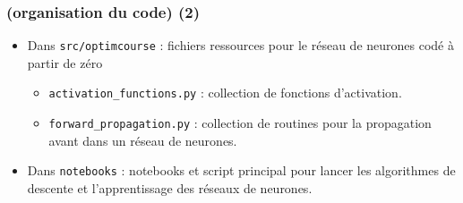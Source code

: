 \documentclass[12pt]{beamer}
\begin{document}
\begin{frame}
\frametitle{(organisation du code) (2)} 
\vspace{-0.4cm}
\begin{itemize}
\small
\item Dans \texttt{src/optimcourse} : fichiers ressources pour le réseau de neurones codé à partir de zéro
\begin{itemize}
\small
\item \texttt{activation\_functions.py} : collection de fonctions d’activation.
\item \texttt{forward\_propagation.py} : collection de routines pour la propagation avant dans un réseau de neurones.
\end{itemize}
\item Dans \texttt{notebooks} : notebooks et script principal pour lancer les algorithmes de descente et l’apprentissage des réseaux de neurones.
\end{itemize}
\end{frame}

\end{document}
